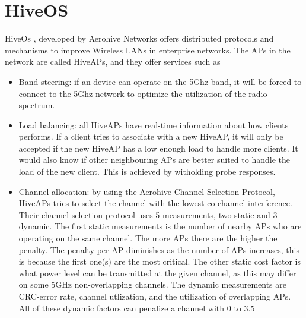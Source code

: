\section{HiveOS}
HiveOs \cite{Aerohive}, developed by Aerohive Networks offers distributed protocols and mechanisms to improve Wireless LANs in enterprise networks. The APs 
in the network are called HiveAPs, and they offer services such as
\begin{itemize}
	\item Band steering: if an device can operate on the 5Ghz band, it will be forced to connect to the 5Ghz network to optimize the utilization of the radio spectrum. 
	\item Load balancing: all HiveAPs have real-time information about how clients performs. If a client tries to associate with a new HiveAP, it will only be accepted
				if the new HiveAP has a low enough load to handle more clients. It would also know if other neighbouring APs are better suited to handle the load of the new client.
				This is achieved by witholding probe responses.

	\item Channel allocation: by using the Aerohive Channel Selection Protocol, HiveAPs tries to select the channel with the lowest co-channel interference. Their channel selection protocol uses 5 measurements, two static and 3 dynamic.
	The first static measurements is the number of nearby APs who are operating on the same channel. The more APs there are the higher the penalty. The penalty per AP diminishes as the number of APs increases, this
		is because the first one(s) are the most critical. The other static cost factor is what power level can be transmitted at the given channel, as this may differ on some 5GHz non-overlapping channels. The dynamic measurements are CRC-error rate, channel utlization,
	and the utilization of overlapping APs. All of these dynamic factors can penalize a channel with 0 to 3.5%
\end{itemize}

